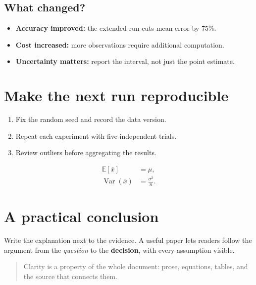 \documentclass[11pt]{article}
\begin{document}
\subsection{What changed?}
\begin{itemize}
\item \textbf{Accuracy improved:} the extended run cuts mean error by 75\%.
\item \textbf{Cost increased:} more observations require additional computation.
\item \textbf{Uncertainty matters:} report the interval, not just the point estimate.
\end{itemize}

\section{Make the next run reproducible}
\begin{enumerate}
\item Fix the random seed and record the data version.
\item Repeat each experiment with five independent trials.
\item Review outliers before aggregating the results.
\end{enumerate}

\begin{align}
\mathbb{E}[\bar{x}] &= \mu, \\
\operatorname{Var}(\bar{x}) &= \frac{\sigma^2}{n}.
\end{align}

\section{A practical conclusion}
Write the explanation next to the evidence. A useful paper lets readers follow the argument from the \emph{question} to the \textbf{decision}, with every assumption visible.

\begin{quote}
Clarity is a property of the whole document: prose, equations, tables, and the source that connects them.
\end{quote}
\end{document}
